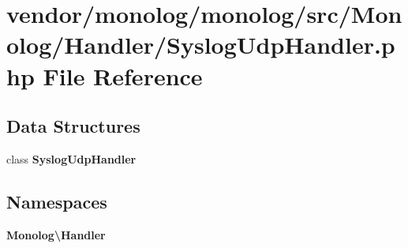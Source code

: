 \section{vendor/monolog/monolog/src/\+Monolog/\+Handler/\+Syslog\+Udp\+Handler.php File Reference}
\label{_syslog_udp_handler_8php}
\subsection*{Data Structures}
\begin{DoxyCompactItemize}
\item 
class {\bf Syslog\+Udp\+Handler}
\end{DoxyCompactItemize}
\subsection*{Namespaces}
\begin{DoxyCompactItemize}
\item 
 {\bf Monolog\textbackslash{}\+Handler}
\end{DoxyCompactItemize}
